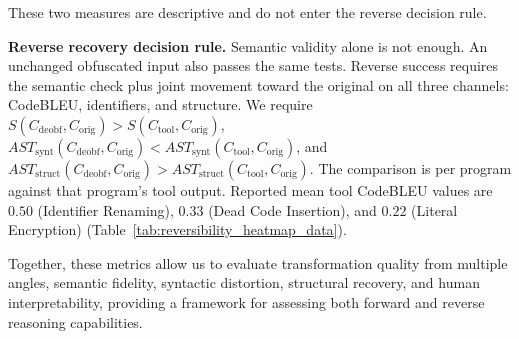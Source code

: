 \begin{itemize}[leftmargin=*]



These two measures are descriptive and do not enter the reverse decision rule.

\end{itemize}

\textbf{Reverse recovery decision rule.}
Semantic validity alone is not enough.
An unchanged obfuscated input also passes the same tests.
Reverse success requires the semantic check plus joint movement toward the original on all three channels: CodeBLEU, identifiers, and structure.
We require $S(C_{\text{deobf}}, C_{\text{orig}}) > S(C_{\text{tool}}, C_{\text{orig}})$, $AST_{\text{synt}}(C_{\text{deobf}}, C_{\text{orig}}) < AST_{\text{synt}}(C_{\text{tool}}, C_{\text{orig}})$, and $AST_{\text{struct}}(C_{\text{deobf}}, C_{\text{orig}}) > AST_{\text{struct}}(C_{\text{tool}}, C_{\text{orig}})$.
The comparison is per program against that program's tool output.
Reported mean tool CodeBLEU values are $0.50$ (Identifier Renaming),
$0.33$ (Dead Code Insertion), and $0.22$ (Literal Encryption)
(Table~\ref{tab:reversibility_heatmap_data}).

Together, these metrics allow us to evaluate transformation quality from multiple angles, semantic fidelity, syntactic distortion, structural recovery, and human interpretability, providing a framework for assessing both forward and reverse reasoning capabilities.